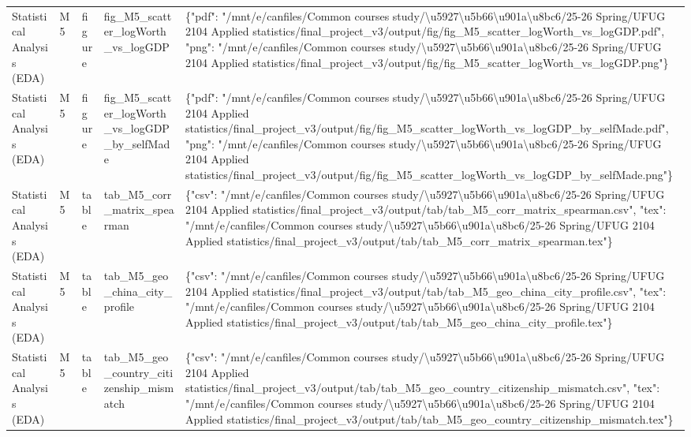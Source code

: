 \begin{tabular}{lllll}
Statistical Analysis (EDA) & M5 & figure & fig\_M5\_scatter\_logWorth\_vs\_logGDP & \{"pdf": "/mnt/e/canfiles/Common courses study/\textbackslash u5927\textbackslash u5b66\textbackslash u901a\textbackslash u8bc6/25-26 Spring/UFUG 2104 Applied statistics/final\_project\_v3/output/fig/fig\_M5\_scatter\_logWorth\_vs\_logGDP.pdf", "png": "/mnt/e/canfiles/Common courses study/\textbackslash u5927\textbackslash u5b66\textbackslash u901a\textbackslash u8bc6/25-26 Spring/UFUG 2104 Applied statistics/final\_project\_v3/output/fig/fig\_M5\_scatter\_logWorth\_vs\_logGDP.png"\} \\
Statistical Analysis (EDA) & M5 & figure & fig\_M5\_scatter\_logWorth\_vs\_logGDP\_by\_selfMade & \{"pdf": "/mnt/e/canfiles/Common courses study/\textbackslash u5927\textbackslash u5b66\textbackslash u901a\textbackslash u8bc6/25-26 Spring/UFUG 2104 Applied statistics/final\_project\_v3/output/fig/fig\_M5\_scatter\_logWorth\_vs\_logGDP\_by\_selfMade.pdf", "png": "/mnt/e/canfiles/Common courses study/\textbackslash u5927\textbackslash u5b66\textbackslash u901a\textbackslash u8bc6/25-26 Spring/UFUG 2104 Applied statistics/final\_project\_v3/output/fig/fig\_M5\_scatter\_logWorth\_vs\_logGDP\_by\_selfMade.png"\} \\
Statistical Analysis (EDA) & M5 & table & tab\_M5\_corr\_matrix\_spearman & \{"csv": "/mnt/e/canfiles/Common courses study/\textbackslash u5927\textbackslash u5b66\textbackslash u901a\textbackslash u8bc6/25-26 Spring/UFUG 2104 Applied statistics/final\_project\_v3/output/tab/tab\_M5\_corr\_matrix\_spearman.csv", "tex": "/mnt/e/canfiles/Common courses study/\textbackslash u5927\textbackslash u5b66\textbackslash u901a\textbackslash u8bc6/25-26 Spring/UFUG 2104 Applied statistics/final\_project\_v3/output/tab/tab\_M5\_corr\_matrix\_spearman.tex"\} \\
Statistical Analysis (EDA) & M5 & table & tab\_M5\_geo\_china\_city\_profile & \{"csv": "/mnt/e/canfiles/Common courses study/\textbackslash u5927\textbackslash u5b66\textbackslash u901a\textbackslash u8bc6/25-26 Spring/UFUG 2104 Applied statistics/final\_project\_v3/output/tab/tab\_M5\_geo\_china\_city\_profile.csv", "tex": "/mnt/e/canfiles/Common courses study/\textbackslash u5927\textbackslash u5b66\textbackslash u901a\textbackslash u8bc6/25-26 Spring/UFUG 2104 Applied statistics/final\_project\_v3/output/tab/tab\_M5\_geo\_china\_city\_profile.tex"\} \\
Statistical Analysis (EDA) & M5 & table & tab\_M5\_geo\_country\_citizenship\_mismatch & \{"csv": "/mnt/e/canfiles/Common courses study/\textbackslash u5927\textbackslash u5b66\textbackslash u901a\textbackslash u8bc6/25-26 Spring/UFUG 2104 Applied statistics/final\_project\_v3/output/tab/tab\_M5\_geo\_country\_citizenship\_mismatch.csv", "tex": "/mnt/e/canfiles/Common courses study/\textbackslash u5927\textbackslash u5b66\textbackslash u901a\textbackslash u8bc6/25-26 Spring/UFUG 2104 Applied statistics/final\_project\_v3/output/tab/tab\_M5\_geo\_country\_citizenship\_mismatch.tex"\} \\

\end{tabular}
